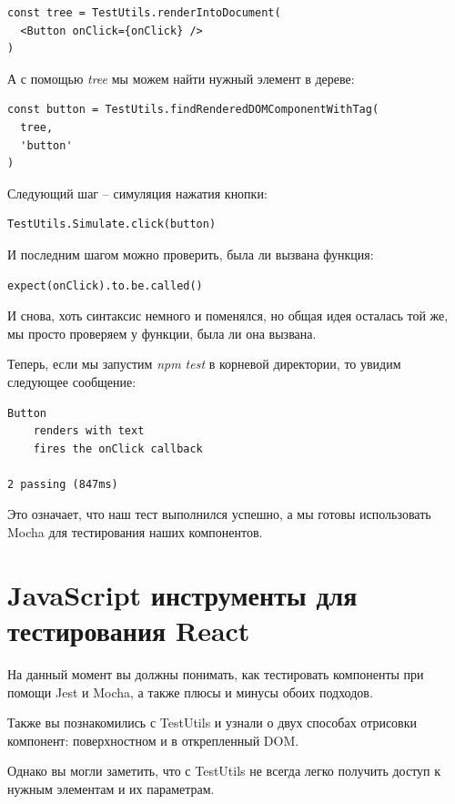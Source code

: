 \begin{lstlisting}
const tree = TestUtils.renderIntoDocument(
  <Button onClick={onClick} />
)
\end{lstlisting}

А с помощью \textit{tree} мы можем найти нужный элемент в дереве:

\begin{lstlisting}
const button = TestUtils.findRenderedDOMComponentWithTag(
  tree,
  'button'
)
\end{lstlisting}

Следующий шаг -- симуляция нажатия кнопки:

\begin{lstlisting}
TestUtils.Simulate.click(button)
\end{lstlisting}

И последним шагом можно проверить, была ли вызвана функция:

\begin{lstlisting}
expect(onClick).to.be.called()
\end{lstlisting}

И снова, хоть синтаксис немного и поменялся, но общая идея осталась той же, мы просто проверяем у функции, была ли она вызвана.

Теперь, если мы запустим \textit{npm test} в корневой директории, то увидим следующее сообщение:

\begin{lstlisting}
Button
	renders with text
	fires the onClick callback
	
2 passing (847ms)
\end{lstlisting}

Это означает, что наш тест выполнился успешно, а мы готовы использовать Mocha для тестирования наших компонентов.

\section{JavaScript инструменты для тестирования React}

На данный момент вы должны понимать, как тестировать компоненты при помощи Jest и Mocha, а также плюсы и минусы обоих подходов.

Также вы познакомились с TestUtils и узнали о двух способах отрисовки компонент: поверхностном и в открепленный DOM.

Однако вы могли заметить, что с TestUtils не всегда легко получить доступ к нужным элементам и их параметрам.

